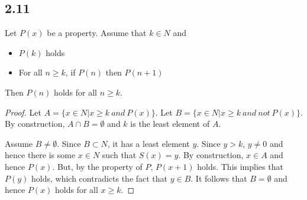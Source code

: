 \subsection*{2.11}

Let $P(x)$ be a property. Assume that $k \in N$ and

\begin{itemize}
    \item $P(k)$ holds
    \item For all $n \geq k$, if $P(n)$ then $P(n+1)$
\end{itemize}

Then $P(n)$ holds for all $n \geq k$.

\begin{proof}
Let $A = \{x \in N|x \geq k~and~P(x)\}$. Let $B = \{x \in N| x \geq k~and~not~P(x)\}$. By construction, $A \cap B = \emptyset$ and $k$ is the least element of $A$.

Assume $B \neq \emptyset$. Since $B \subset N$, it has a least element $y$. Since $y > k$, $y \neq 0$ and hence there is some $x \in N$ such that $S(x) = y$. By construction, $x \in A$ and hence $P(x)$. But, by the property of $P$, $P(x+1)$ holds. This implies that $P(y)$ holds, which contradicts the fact that $y \in B$. It follows that $B = \emptyset$ and hence $P(x)$ holds for all $x \geq k$.

\end{proof}

